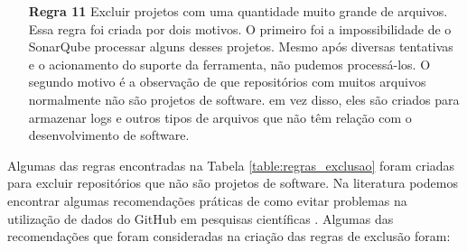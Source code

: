 \begin{itemize}
\item[\textbf{Regra 11}] Excluir projetos com uma quantidade muito grande de arquivos. Essa regra foi criada por dois motivos. O primeiro foi a impossibilidade de o SonarQube processar alguns desses projetos. Mesmo após diversas tentativas e o acionamento do suporte da ferramenta, não pudemos processá-los. O segundo motivo é a observação de que repositórios com muitos arquivos normalmente não são projetos de software. em vez disso, eles são criados para armazenar logs e outros tipos de arquivos que não têm relação com o desenvolvimento de software.
\end{itemize} 



Algumas das regras encontradas na Tabela  \ref{table:regras_exclusao} foram criadas para excluir repositórios que não são projetos de software. Na literatura podemos encontrar algumas recomendações práticas de como evitar problemas na utilização de dados do GitHub em pesquisas científicas \cite{kalliamvakou2014promises,bird2009promises,tsay2014influence}.  Algumas das recomendações que foram consideradas na criação das regras de exclusão foram:

